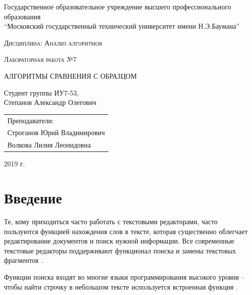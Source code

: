 \documentclass[a4paper,12pt]{article}
\newcommand{\anonsection}[1]{\section*{#1}\addcontentsline{toc}{section}{#1}}
\begin{document}
\begin{titlepage}

    \begin{center}
        \large
        Государственное образовательное учреждение высшего профессионального образования\\
        “Московский государственный технический университет имени Н.Э.Баумана”
        \vspace{3cm}

        \textsc{Дисциплина: Анализ алгоритмов}
        \vspace{0.5cm}

        \textsc{Лабораторная работа №7}
        \vspace{3cm}

        {\LARGE АЛГОРИТМЫ СРАВНЕНИЯ С ОБРАЗЦОМ}
        \vspace{3cm}

        Студент группы ИУ7-53,\\
        Степанов Александр Олегович
        \vfill
    \end{center}

    \begin{flushright}
        \begin{tabular}{l}
            Преподаватели:\\
            Строганов Юрий Владимирович\\
            Волкова Лилия Леонидовна
        \end{tabular}
    \end{flushright}

    \begin{center}

        2019 г.

    \end{center}

\end{titlepage}

\tableofcontents

\newpage
\anonsection{Введение}

Те, кому приходиться часто работать с текстовыми редакторами,
часто пользуются функцией нахождения слов в тексте,
которая существенно облегчает редактирование документов и
поиск нужной информации. Все современные текстовые редакторы
поддерживают функционал поиска и замены
текстовых фрагментов \cite{office}.

Функции поиска входят во многие языки
программирования высокого уровня – чтобы найти строчку
в небольшом тексте используется встроенная функция \cite{cpp}.
\end{document}
